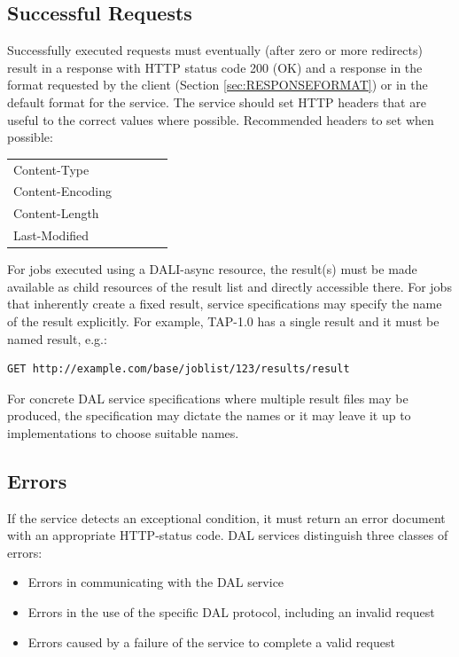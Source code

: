 \documentclass[11pt,letter]{ivoa}
\begin{document}
\subsection{Successful Requests}
\label{sec:response-ok}
Successfully executed requests must eventually (after zero or more redirects)
result in a response with HTTP status code 200 (OK) and a response in the format
requested by the client (Section \ref{sec:RESPONSEFORMAT}) or in the default format for the
service. The service should set HTTP headers \citep{std:HTTP} that are useful to the correct values
where possible. Recommended headers to set when possible:

\begin{tabular}{l l l l l}
\label{tab:headers}
Content-Type \\
Content-Encoding \\
Content-Length \\
Last-Modified \\
\end{tabular}

For jobs executed using a DALI-async resource, the result(s) must be made
available as child resources of the result list and directly accessible there.
For jobs that inherently create a fixed result, service specifications may
specify the name of the result explicitly. For example, TAP-1.0 has a single
result and it must be named result, e.g.:

\begin{verbatim}
GET http://example.com/base/joblist/123/results/result
\end{verbatim}

For concrete DAL service specifications where multiple result files may be
produced, the specification may dictate the names or it may leave it up to
implementations to choose suitable names.

\subsection{Errors}
\label{sec:response-error}
If the service detects an exceptional condition, it must return an error
document with an appropriate HTTP-status code. DAL services distinguish three
classes of errors:

\begin{itemize}
\item Errors in communicating with the DAL service

\item Errors in the use of the specific DAL protocol, including an invalid
request

\item Errors caused by a failure of the service to complete a valid request
\end{itemize}
\end{document}
